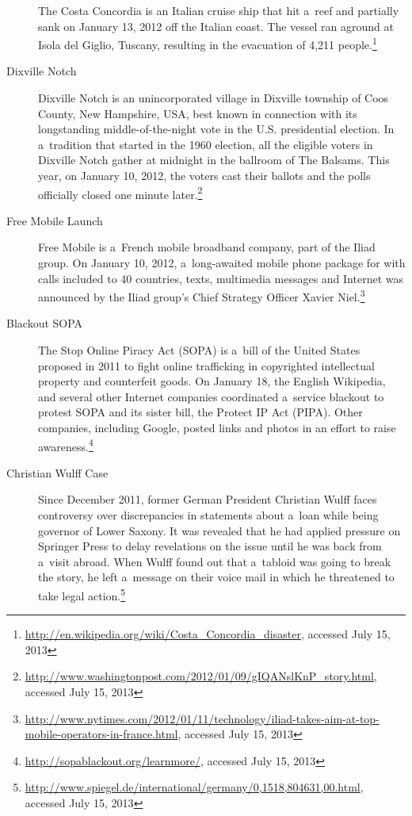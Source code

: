 \begin{description}
       The Costa Concordia is an Italian cruise ship that hit
       a~reef and partially sank on January 13, 2012 off the
       Italian coast. The vessel ran aground at Isola del Giglio,
       Tuscany, resulting in the evacuation of 4,211
       people.\footnote{\url{http://en.wikipedia.org/wiki/Costa_Concordia_disaster},
       accessed July 15, 2013}
  \item[Dixville Notch]
       Dixville Notch is an unincorporated village in Dixville
       township of Coos County, New Hampshire, USA, best known in
       connection with its longstanding middle-of-the-night vote in
       the U.S. presidential election. In a~tradition that started
       in the 1960 election, all the eligible voters in Dixville
       Notch gather at midnight in the ballroom of The Balsams.
       This year, on January 10, 2012, the voters cast their
       ballots and the polls officially closed one minute
       later.\footnote{\url{http://www.washingtonpost.com/2012/01/09/gIQANslKnP_story.html},
       accessed July 15, 2013}
  \item[Free Mobile Launch]
       Free Mobile is a~French mobile broadband company, part of
       the Iliad group. On January 10, 2012, a~long-awaited mobile
       phone package for  with calls included to 40
       countries, texts, multimedia messages and Internet was
       announced by the Iliad group's Chief Strategy Officer
       Xavier
       Niel.\footnote{\url{http://www.nytimes.com/2012/01/11/technology/iliad-takes-aim-at-top-mobile-operators-in-france.html},
       accessed July 15, 2013}
  \item[Blackout SOPA]
       The Stop Online Piracy Act (SOPA) is a~bill of the United
       States proposed in 2011 to fight online trafficking in
       copyrighted intellectual property and counterfeit goods.
       On January 18, the English Wikipedia, and several
       other Internet companies coordinated a~service blackout
       to protest SOPA and its sister bill, the Protect IP Act
       (PIPA).
       Other companies, including Google, posted links and
       photos in an effort to raise
       awareness.\footnote{\url{http://sopablackout.org/learnmore/},
       accessed July 15, 2013}
  \item[Christian Wulff Case]
       Since December 2011, former German President Christian
       Wulff faces controversy over discrepancies in statements
       about a~loan while being governor of Lower Saxony.
       It was revealed that he had applied pressure
       on Springer Press to delay revelations on the issue until
       he was back from a~visit abroad. When Wulff found out that
       a~tabloid was going to break the story, he left a~message
       on their voice mail in which he threatened to take legal
       action.\footnote{\url{http://www.spiegel.de/international/germany/0,1518,804631,00.html},
       accessed July 15, 2013}
\end{description}

